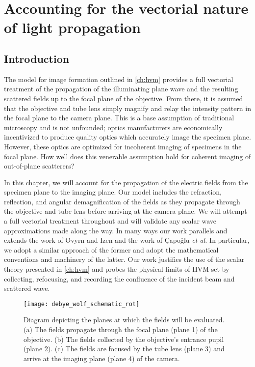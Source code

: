 \chapter{Accounting for the vectorial nature of light propagation}
\label{ch:debye}




\section{Introduction}

The model for image formation outlined in \autoref{ch:hvm} provides a full
vectorial treatment of the propagation of the illuminating plane wave and
the resulting scattered fields up to the focal plane of the objective.
From there, it is assumed that the objective and tube lens simply magnify and
relay the intensity pattern in the focal plane to the camera plane.
This is a base assumption of traditional microscopy and is not unfounded; optics
manufacturers are economically incentivized to produce quality optics which
accurately image the specimen plane. However, these optics are optimized for
incoherent imaging of specimens in the focal plane.
How well does this venerable assumption hold for coherent imaging of out-of-plane
scatterers?

In this chapter, we will account for the propagation of the electric fields from
the specimen plane to the imaging plane. Our model includes the
refraction, reflection, and angular demagnification of the fields as they propagate
through the objective and tube lens before arriving at the camera plane.
We will attempt a full vectorial treatment throughout and will
validate any scalar wave approximations made along the way. In many ways our work
parallels and extends the work of Ovyrn and Izen\cite{izen00} and the work of
\c{C}apo\u{g}lu\cite{capoglu12} \emph{et al.} In particular, we adopt a similar
approach of the former and adopt the mathematical conventions and machinery of the latter.
Our work justifies the use of the scalar theory presented in \autoref{ch:hvm} and
probes the physical limits of HVM set by collecting, refocusing, and recording
the confluence of the incident beam and scattered wave.

\begin{figure}
  \centering
  \texttt{[image: debye\_wolf\_schematic\_rot]}
  \caption{Diagram depicting the planes at which the fields will be evaluated.
    (a) The fields propagate through the focal plane (plane 1) of the objective.
    (b) The fields collected by the objective's entrance pupil (plane 2).
    (c) The fields are focused by the tube lens (plane 3) and arrive at the
    imaging plane (plane 4) of the camera.}
  \label{fig:debye_schematic}
\end{figure}

